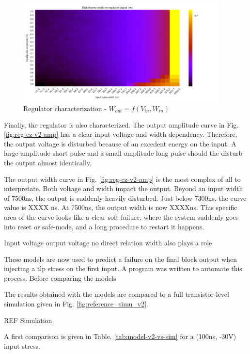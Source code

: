 \begin{figure}[!htb]
  \centering
  \includegraphics[width=0.95\textwidth]{src/4/figures/regulator_cz_V2_width.png}
  \caption{Regulator characterization - $W_{out} = f(V_{in}, W_{in})$}
  \label{fig:reg-cz-v2-width}
\end{figure}

Finally, the regulator is also characterized.
The output amplitude curve in Fig. \ref{fig:reg-cz-v2-amp} has a clear input voltage and width dependency.
Therefore, the output voltage is disturbed because of an excedent energy on the input.
A large-amplitude short pulse and a small-amplitude long pulse should the disturb the output almost identically.

The output width curve in Fig. \ref{fig:reg-cz-v2-amp} is the most complex of all to interpretate.
Both voltage and width impact the output.
Beyond an input width of 7500ns, the output is suddenly heavily disturbed.
Just below 7300ns, the curve value is XXXX ns.
At 7500ns, the output width is now XXXXns.
This specific area of the curve looks like a clear soft-failure, where the system suddenly goes into reset or safe-mode, and a long procedure to restart it happens.

Input voltage output voltage no direct relation
width also plays a role

These models are now used to predict a failure on the final block output when injecting a \gls{tlp} stress on the first input.
A program was written to automate this process.
Before comparing the models

The results obtained with the models are compared to a full transistor-level simulation given in Fig. \ref{fig:reference_simu_v2}.

REF Simulation

A first comparison is given in Table. \ref{tab:model-v2-vs-sim} for a (100ns, -30V) input stress.


